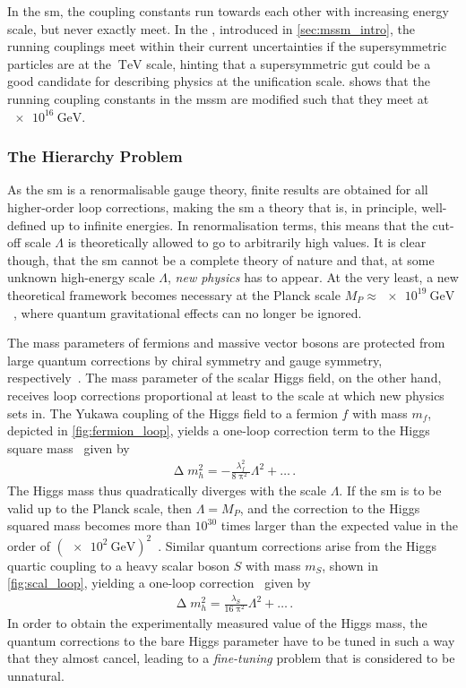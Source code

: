 In the \gls{sm}, the coupling constants run towards each other with increasing energy scale, but never exactly meet. In the , introduced in \cref{sec:mssm_intro}, the running couplings meet within their current uncertainties if the supersymmetric particles are at the $\SI{}{\TeV}$ scale, hinting that a supersymmetric \gls{gut} could be a good candidate for describing physics at the unification scale.  shows that the running coupling constants in the \gls{mssm} are modified such that they meet at $\SI{e16}{\GeV}$.

\subsubsection{The Hierarchy Problem}

As the \gls{sm} is a renormalisable gauge theory, finite results are obtained for all higher-order loop corrections, making the \gls{sm} a theory that is, in principle, well-defined up to infinite energies. In renormalisation terms, this means that the cut-off scale $\Lambda$ is theoretically allowed to go to arbitrarily high values. It is clear though, that the \gls{sm} cannot be a complete theory of nature and that, at some unknown high-energy scale $\Lambda$, \textit{new physics} has to appear. At the very least, a new theoretical framework becomes necessary at the Planck scale $M_P \approx \SI{e19}{\GeV}$~\cite{Bustamante:2009us}, where quantum gravitational effects can no longer be ignored.

The mass parameters of fermions and massive vector bosons are protected from large quantum corrections by chiral symmetry and gauge symmetry, respectively~\cite{Aitchison:2007fn}. The mass parameter of the scalar Higgs field, on the other hand, receives loop corrections proportional at least to the scale at which new physics sets in. The Yukawa coupling of the Higgs field to a fermion $f$ with mass $m_f$, depicted in \cref{fig:fermion_loop}, yields a one-loop correction term to the Higgs square mass~\cite{Bustamante:2009us} given by
\begin{align}
	\upDelta m_h^2 = -\frac{\lambda_f^2}{8\uppi^2} \Lambda^2 + \dots\, .
	\label{eq:fermion_correction}
\end{align}
The Higgs mass thus quadratically diverges with the scale $\Lambda$. If the \gls{sm} is to be valid up to the Planck scale, then $\Lambda = M_P$, and the correction to the Higgs squared mass becomes more than $10^{30}$ times larger than the expected value in the order of $(\SI{e2}{\GeV})^2$~\cite{Martin:1997ns}.
Similar quantum corrections arise from the Higgs quartic coupling to a heavy scalar boson $S$ with mass $m_S$, shown in \cref{fig:scal_loop}, yielding a one-loop correction~\cite{Bustamante:2009us} given by 
\begin{align}
	\upDelta m_h^2 = \frac{\lambda_S}{16\uppi^2}\Lambda^2 + \dots\, .
	\label{eq:scalar_correction}
\end{align}
In order to obtain the experimentally measured value of the Higgs mass, the quantum corrections to the bare Higgs parameter have to be tuned in such a way that they almost cancel, leading to a \textit{fine-tuning} problem that is considered to be unnatural.

